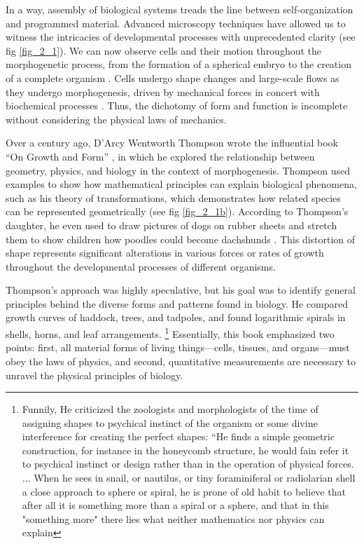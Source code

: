 In a way, assembly of biological systems treads the line between self-organization and programmed material. Advanced microscopy techniques have allowed us to witness the intricacies of developmental processes with unprecedented clarity (see fig \ref{fig_2_1}). We can now observe cells and their motion throughout the morphogenetic process, from the formation of a spherical embryo to the creation of a complete organism \cite{shah2019}. Cells undergo shape changes and large-scale flows as they undergo morphogenesis, driven by mechanical forces in concert with biochemical processes \cite{labernadie2018, trepat2018, lecuit2011}. Thus, the dichotomy of form and function is incomplete without considering the physical laws of mechanics.


Over a century ago, D'Arcy Wentworth Thompson wrote the influential book ``On Growth and Form'' \cite{thompson1979}, in which he explored the relationship between geometry, physics, and biology in the context of morphogenesis. Thompson used examples to show how mathematical principles can explain biological phenomena, such as his theory of transformations, which demonstrates how related species can be represented geometrically (see fig \ref{fig_2_1b}). According to Thompson's daughter, he even used to draw pictures of dogs on rubber sheets and stretch them to show children how poodles could become dachshunds \cite{wolfram2022}. This distortion of shape represents significant alterations in various forces or rates of growth throughout the developmental processes of different organisms.

Thompson's approach was highly speculative, but his goal was to identify general principles behind the diverse forms and patterns found in biology. He compared growth curves of haddock, trees, and tadpoles, and found logarithmic spirals in shells, horns, and leaf arrangements.
\footnote{Funnily, He criticized the zoologists and morphologists of the time of assigning shapes to psychical instinct of the organism or some divine interference for creating the perfect shapes: “He finds a simple geometric construction, for instance in the honeycomb structure, he would fain refer it to psychical instinct or design rather than in the operation of physical forces. ... When he sees in snail, or nautilus, or tiny foraminiferal or radiolarian shell a close approach to sphere or spiral, he is prone of old habit to believe that after all it is something more than a spiral or a sphere, and that in this "something more" there lies what neither mathematics nor physics can explain}
Essentially, this book emphasized two points: first, all material forms of living things---cells, tissues, and organs---must obey the laws of physics, and second, quantitative measurements are necessary to unravel the physical principles of biology.

